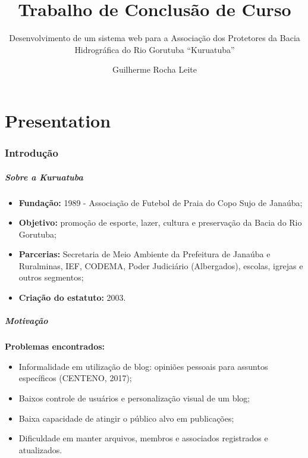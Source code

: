 \documentclass[xcolor=table]{beamer}
\title[Trabalho de Conclusão de Curso]{Trabalho de Conclusão de Curso}
\subtitle{Desenvolvimento de um sistema web para a Associação dos Protetores da Bacia Hidrográfica do Rio Gorutuba ``Kuruatuba''}
\author[Guilherme Rocha Leite]{Guilherme Rocha Leite}
\institute[UFVJM]{Universidade Federal dos Vales do Jequitinhonha e Mucuri \newline
  Bacharelado em Sistemas de Informação \newline
	  
     Orientador: Prof. Erinaldo Barbosa da Silva\\
     Coorientador: Thales Francisco Mota Carvalho\\
     $~$\\
}
\begin{document}
\frame{\titlepage}

\part{Presentation}




\section{Introdução}

\begin{frame}
    \frametitle{Sobre a Kuruatuba}
    \begin{itemize}
        \item \textbf{Fundação:} 1989 - Associação de Futebol de Praia do Copo Sujo de Janaúba;
        \item \textbf{Objetivo:} promoção de esporte, lazer, cultura e preservação da Bacia do Rio Gorutuba;
        \item \textbf{Parcerias:} Secretaria de Meio Ambiente da Prefeitura de Janaúba e Ruralminas, IEF, CODEMA, Poder Judiciário (Albergados), escolas, igrejas e outros segmentos;
        \item \textbf{Criação do estatuto:} 2003.
    \end{itemize}

\end{frame}


\begin{frame}
    \frametitle{Motivação}
    
    \textbf{Problemas encontrados:}
    \begin{itemize}
        \item Informalidade em utilização de blog: opiniões pessoais para assuntos específicos (CENTENO, 2017);
        \item Baixos controle de usuários e personalização visual de um blog; %
        \item Baixa capacidade de atingir o público alvo em publicações; %
        \item Dificuldade em manter arquivos, membros e associados registrados e atualizados.
    \end{itemize}

\end{frame}
\end{document}
